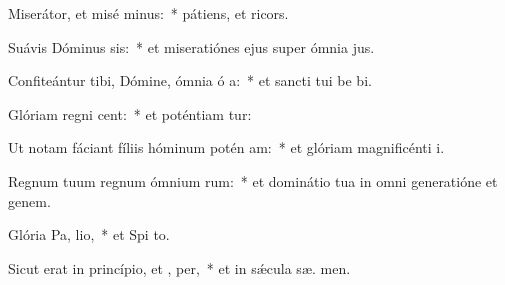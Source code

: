 \item Miserátor, et misé minus:~* pátiens, et  ricors.
\item Suávis Dóminus sis:~* et miseratiónes ejus super ómnia  jus.
\item Confiteántur tibi, Dómine, ómnia ó a:~* et sancti tui be bi.
\item Glóriam regni  cent:~* et poténtiam  tur:
\item Ut notam fáciant fíliis hóminum potén am:~* et glóriam magnificénti  i.
\item Regnum tuum regnum ómnium rum:~* et dominátio tua in omni generatióne et genem.
\item Glória Pa,  lio,~* et Spi to.
\item Sicut erat in princípio, et ,  per,~* et in sǽcula sæ. men.
